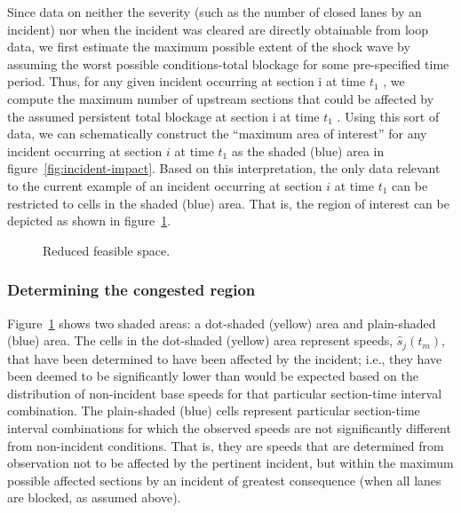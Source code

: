 \documentclass[12pt]{report}
\newcommand{\inputTikZ}[1]{%
  }
\newcommand{\inputTikZ}[1]{%
    \beginpgfgraphicnamed{#1-external}%
    \endpgfgraphicnamed%
  }
\begin{document}
Since data on neither the severity (such as the number of closed lanes
by an incident) nor when the incident was cleared are directly
obtainable from loop data, we first estimate the maximum possible
extent of the shock wave by assuming the worst possible
conditions-total blockage for some pre-specified time period. Thus,
for any given incident occurring at section i at time $t_1$ , we
compute the maximum number of upstream sections that could be affected
by the assumed persistent total blockage at section i at time $t_1$
. Using this sort of data, we can schematically construct the
``maximum area of interest'' for any incident occurring at section $i$
at time $t_1$ as the shaded (blue) area in
figure~\ref{fig:incident-impact}. Based on this interpretation, the
only data relevant to the current example of an incident occurring at
section $i$ at time $t_1$ can be restricted to cells in the shaded
(blue) area. That is, the region of interest can be
depicted as shown in figure~\ref{fig:incident-impact-feas}.
\begin{figure}[tbp]
  \begin{center}
    \inputTikZ{figs/time-space-incident-schematic-reduced}
    \caption[Reduced feasible space]{Reduced feasible space.}
    \label{fig:incident-impact-feas}
  \end{center}
\end{figure}


\subsubsection{Determining the congested region}
\label{sec:det-cong-reg}

Figure~\ref{fig:incident-impact-feas} shows two shaded areas: a
dot-shaded (yellow) area and plain-shaded (blue) area. The cells in
the dot-shaded (yellow) area represent speeds, $\hat{s}_j(t_m)$, that
have been determined to have been affected by the incident; i.e., they
have been deemed to be significantly lower than would be expected
based on the distribution of non-incident base speeds for that
particular section-time interval combination.  The plain-shaded (blue)
cells represent particular section-time interval combinations for
which the observed speeds are not significantly different from
non-incident conditions.  That is, they are speeds that are determined
from observation not to be affected by the pertinent incident, but
within the maximum possible affected  sections by an
incident of greatest consequence (when all lanes are blocked, as
assumed above).
\end{document}

